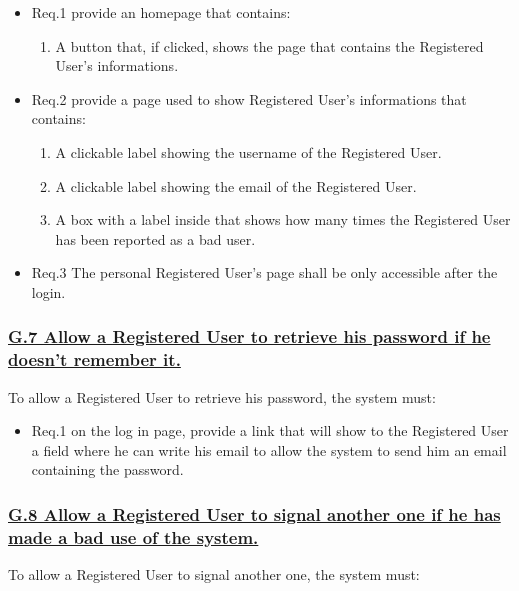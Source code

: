 				\begin{itemize}
					\item \lbrack Req.1\rbrack \label{sec:fr1_g6} provide an homepage that contains:
						\begin{enumerate}
							\item A button that, if clicked, shows the page that contains the Registered User's informations.
						\end{enumerate}
					\item \lbrack Req.2\rbrack \label{sec:fr2_g6} provide a page used to show Registered User's informations that contains:
						\begin{enumerate}
							\item A clickable label showing the username of the Registered User.
							\item A clickable label showing the email of the Registered User.
							\item A box with a label inside that shows how many times the Registered User has been reported as a bad user.
						\end{enumerate}
					\item \lbrack Req.3\rbrack \label{sec:fr3_g6} The personal Registered User's page shall be only accessible after the login.
				\end{itemize}

			\subsubsection{\lbrack \hyperref[sec:g7]{G.7 Allow a Registered User to retrieve his password if he doesn't remember it.}\rbrack}\label{sec:frs7}
			To allow a Registered User to retrieve his password, the system must:

				\begin{itemize}
					\item \lbrack Req.1\rbrack \label{sec:fr1_g7} on the log in page, provide a link that will show to the Registered User a field where he can write his email to allow the system to send him an email containing the password.
				\end{itemize}

			\subsubsection{\lbrack \hyperref[sec:g8]{G.8 Allow a Registered User to signal another one if he has made a bad use of the system.}\rbrack}\label{sec:frs8}
			To allow a Registered User to signal another one, the system must:

